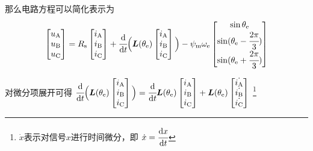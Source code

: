 那么电路方程可以简化表示为
\begin{equation*}
    \begin{bmatrix}
        u_{\mathrm{A}}\\u_{\mathrm{B}}\\u_{\mathrm{C}}
    \end{bmatrix}
    =
    R_{\mathrm{s}}
    \begin{bmatrix}
        i_{\mathrm{A}}\\i_{\mathrm{B}}\\i_{\mathrm{C}}
    \end{bmatrix}
    +
    \cfrac{\mathrm{d}}{\mathrm{d} t}
    \Big(\bm{L}(\theta_{\mathrm{e}})
    \begin{bmatrix}
        i_{\mathrm{A}}\\i_{\mathrm{B}}\\i_{\mathrm{C}}
    \end{bmatrix}
    \Big)-
    \psi_{\mathrm{m}}\omega_{\mathrm{e}}
    \begin{bmatrix}
        \sin\theta_{\mathrm{e}}\\
        \sin(\theta_{\mathrm{e}}-\cfrac{2\pi}{3})\\
        \sin(\theta_{\mathrm{e}}+\cfrac{2\pi}{3})
    \end{bmatrix}
\end{equation*}

对微分项展开可得
\(\cfrac{\mathrm{d}}{\mathrm{d} t}\Big(\bm{L}(\theta_{\mathrm{e}})
\begin{bmatrix}
    {{i_{\mathrm{A}}}}\\{{i_{\mathrm{B}}}}\\{{i_{\mathrm{C}}}}
\end{bmatrix}\Big)
=
\cfrac{\mathrm{d}}{\mathrm{d} t}\bm{L}(\theta_{\mathrm{e}})
\begin{bmatrix}
    i_{\mathrm{A}}\\i_{\mathrm{B}}\\i_{\mathrm{C}}
\end{bmatrix}
+
\bm{L}(\theta_{\mathrm{e}})
\begin{bmatrix}
    \dot{i_{\mathrm{A}}}\\\dot{i_{\mathrm{B}}}\\\dot{i_{\mathrm{C}}}
\end{bmatrix}\)
\footnote{\(\dot{x}\)表示对信号\(x\)进行时间微分，即
\(\dot{x}=\cfrac{\mathrm{d} x}{\mathrm{d} t}\)}

